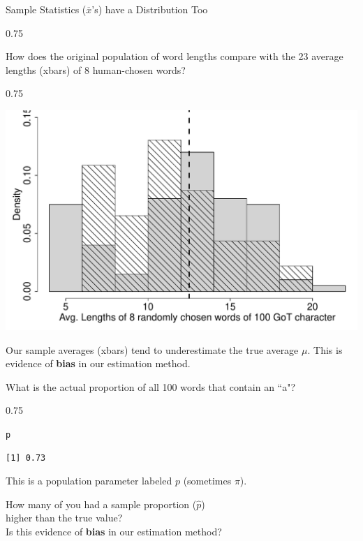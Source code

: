 \documentclass{beamer}\usepackage[]{graphicx}\usepackage[]{color}
\makeatletter
\newcommand{\hlstd}[1]{\textcolor[rgb]{0.102,0.102,0.102}{#1}}%
\newenvironment{kframe}{%
 \def\at@end@of@kframe{}%
 \ifinner\ifhmode%
  \def\at@end@of@kframe{\end{minipage}}%
  \begin{minipage}{\columnwidth}%
 \fi\fi%
 \def\FrameCommand##1{\hskip\@totalleftmargin \hskip-\fboxsep
 \colorbox{shadecolor}{##1}\hskip-\fboxsep
     \hskip-\linewidth \hskip-\@totalleftmargin \hskip\columnwidth}%
 \MakeFramed {\advance\hsize-\width
   \@totalleftmargin\z@ \linewidth\hsize
   \@setminipage}}%
 {\par\unskip\endMakeFramed%
 \at@end@of@kframe}
\newenvironment{knitrout}{}{} %
\renewenvironment{knitrout}{\begin{spacing}{0.75}\begin{tiny}}{\end{tiny}\end{spacing}}
\newcommand{\xbar}{\overline{x}}
\newcommand{\phat}{\widehat{p}}
\makeatother
\begin{document}
\begin{frame}{Sample Statistics ($\xbar$'s) have a Distribution Too\;\;}
\begin{knitrout}
{}



\end{knitrout}


\newpage

How does the original population of word lengths compare
with the 23 average lengths (xbars) of 8 human-chosen words?
\vskip0.25cm
\begin{knitrout}\small
{}\color{fgcolor}

{\centering \includegraphics[width=0.79\linewidth]{figure/graphics-unnamed-chunk-18-1} 

}



\end{knitrout}
\vskip0.25cm
Our sample averages (xbars) tend to underestimate
the true average $\mu$.
This is evidence of \textbf{bias} in our estimation method.

\newpage

What is the actual proportion of all 100 words that contain an ``a"?
\vskip0.25cm

\begin{knitrout}\small
{}\color{fgcolor}\begin{kframe}
\begin{alltt}
\hlstd{p}
\end{alltt}
\begin{verbatim}
[1] 0.73
\end{verbatim}
\end{kframe}
\end{knitrout}
\vskip0.25cm
This is a population parameter labeled $p$ (sometimes $\pi$).

\vskip0.5cm
How many of you had a sample proportion ($\phat$) \\
higher than the true value? \\
\vskip0.5cm
Is this evidence of \textbf{bias} in our estimation method?


\end{frame}
\end{document}
